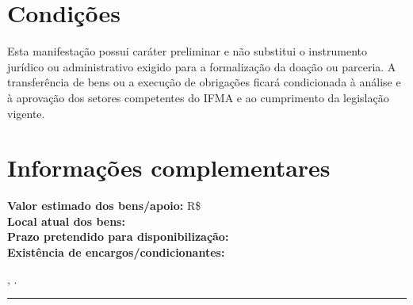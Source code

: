 \documentclass[12pt,a4paper]{article}
\begin{document}
\section{Condições}
Esta manifestação possui caráter preliminar e não substitui o instrumento jurídico ou administrativo exigido para a formalização da doação ou parceria. A transferência de bens ou a execução de obrigações ficará condicionada à análise e à aprovação dos setores competentes do IFMA e ao cumprimento da legislação vigente.

\section{Informações complementares}
\textbf{Valor estimado dos bens/apoio:} R\$ \\
\textbf{Local atual dos bens:} \\
\textbf{Prazo pretendido para disponibilização:} \\
\textbf{Existência de encargos/condicionantes:} 

\vfill
\begin{center}
, .\\[15mm]
\rule{8cm}{0.4pt}\\
\\
\end{center}
\end{document}
